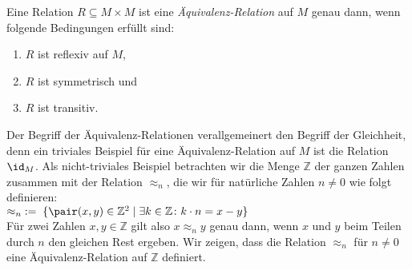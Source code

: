 \begin{Definition}
Eine Relation $R \subseteq M \times M$  ist eine 
\emph{Äquivalenz-Relation} auf $M$ genau dann, wenn folgende Bedingungen erfüllt sind:
\begin{enumerate}
\item $R$ ist reflexiv auf $M$,
\item $R$ ist symmetrisch und
\item $R$ ist transitiv.
\end{enumerate}
\end{Definition}

Der Begriff der Äquivalenz-Relationen verallgemeinert den Begriff der Gleichheit, denn
ein triviales Beispiel für eine Äquivalenz-Relation auf $M$ ist die Relation $\id_M$.
Als nicht-triviales Beispiel betrachten wir die Menge $\mathbb{Z}$ der ganzen Zahlen
zusammen mit der Relation $\approx_n$, die wir für natürliche Zahlen $n \not= 0$ wie folgt definieren: \\[0.2cm]
\hspace*{1.3cm}
 $\approx_n \;:=\; \{ \pair(x,y) \in \mathbb{Z}^2 \mid \exists k \in \mathbb{Z} \colon k \cdot n = x - y \}$
\\[0.2cm]
Für zwei Zahlen $x,y \in \mathbb{Z}$ gilt also  $x \approx_n y$ genau dann, wenn $x$ und
$y$ beim Teilen durch $n$ den gleichen Rest ergeben.   Wir zeigen, dass die
Relation $\approx_n$ für $n \not=0$ eine Äquivalenz-Relation auf $\mathbb{Z}$ definiert.
